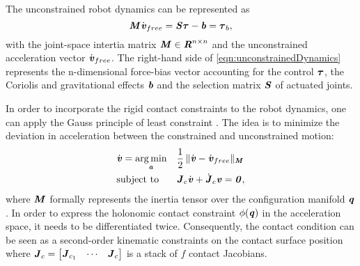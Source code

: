 The unconstrained robot dynamics can be represented as 
\begin{equation}\label{eqn:unconstrainedDynamics}
\bm{\mathit{M}}\dot{\bm{\mathit{v}}}_{free}=\bm{\mathit{S\tau}}-\bm{\mathit{b}}=\bm{\mathit{\tau}}_b, 
\end{equation}
with the joint-space intertia matrix $\bm{\mathit{M}}\in \bm{\mathit{R}}^{n\times n}$ and the unconstrained acceleration vector $\dot{\bm{\mathit{v}}}_{free}$. The right-hand side of \cref{eqn:unconstrainedDynamics} represents the n-dimensional force-bias vector accounting for the control $\bm{\mathit{\tau}}$, the Coriolis and gravitational effects $\bm{\mathit{b}}$ and the selection matrix $\bm{\mathit{S}}$ of actuated joints. 

In order to incorporate the rigid contact constraints to the robot dynamics, one can apply the Gauss principle of least constraint \cite{udwadia1992new}. The idea is to minimize the deviation in acceleration between the constrained and unconstrained motion:
\begin{equation}\label{eqn:gaussMinimization}
\begin{aligned} & \dot{\bm{\mathit{v}}} = \underset{\bm{\mathit{a}}}{\arg\min} & & \frac{1}{2}\,\|\dot{\bm{\mathit{v}}}-\dot{\bm{\mathit{v}}}_{free}\|_{\bm{\mathit{M}}} \\ & \textrm{subject to} & & \bm{\mathit{J}}_{c} \dot{\bm{\mathit{v}}} + \dot{\bm{\mathit{J}}}_c \bm{\mathit{v}} = \bm{\mathit{0}}, \end{aligned}
\end{equation}
where $\bm{\mathit{M}}$ formally represents the inertia tensor over the configuration manifold $\bm{\mathit{q}}$. In order to express the holonomic contact constraint $\phi(\bm{\mathit{q}})$ in the acceleration space, it needs to be differentiated twice. Consequently, the contact condition can be seen as a second-order kinematic constraints on the contact surface position where $\bm{\mathit{J}}_{c}= \begin{bmatrix} \bm{\mathit{J}}_{c_1} & \cdots & \bm{\mathit{J}}_{c}\end{bmatrix}$ is a stack of $f$ contact Jacobians. 

